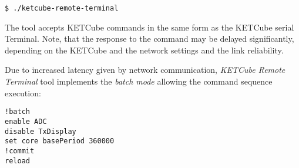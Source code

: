 \begin{Verbatim}[frame=single, fontsize=\small]
$ ./ketcube-remote-terminal
\end{Verbatim}

The tool accepts KETCube commands in the same form as the KETCube serial Terminal. Note, that the response to the command may be delayed significantly, depending on the KETCube and the network settings and the link reliability. 

Due to increased latency given by network communication, {\it KETCube Remote Terminal} tool implements the {\it batch mode} allowing the command sequence execution:

\begin{Verbatim}[frame=single, fontsize=\small]
!batch
enable ADC
disable TxDisplay
set core basePeriod 360000
!commit
reload
\end{Verbatim}






\clearpage





